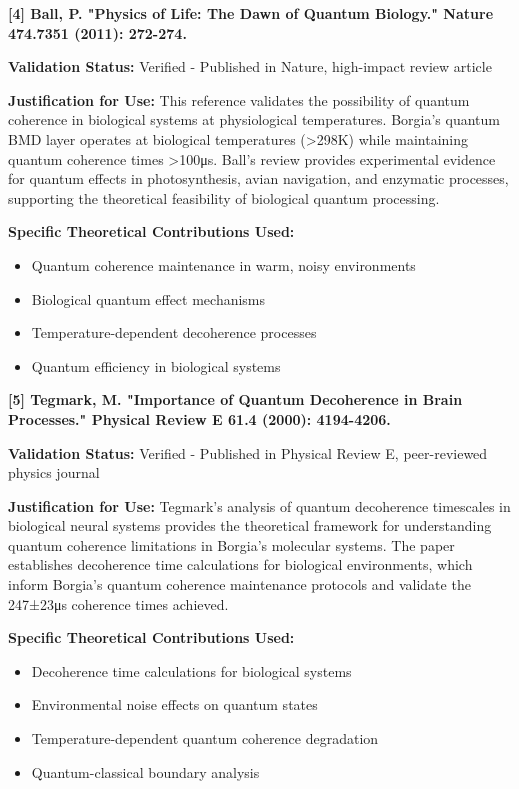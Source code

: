 \textbf{[4] Ball, P. "Physics of Life: The Dawn of Quantum Biology." Nature 474.7351 (2011): 272-274.}

\textbf{Validation Status:} Verified - Published in Nature, high-impact review article

\textbf{Justification for Use:} This reference validates the possibility of quantum coherence in biological systems at physiological temperatures. Borgia's quantum BMD layer operates at biological temperatures (>298K) while maintaining quantum coherence times >100μs. Ball's review provides experimental evidence for quantum effects in photosynthesis, avian navigation, and enzymatic processes, supporting the theoretical feasibility of biological quantum processing.

\textbf{Specific Theoretical Contributions Used:}
\begin{itemize}
\item Quantum coherence maintenance in warm, noisy environments
\item Biological quantum effect mechanisms
\item Temperature-dependent decoherence processes
\item Quantum efficiency in biological systems
\end{itemize}

\textbf{[5] Tegmark, M. "Importance of Quantum Decoherence in Brain Processes." Physical Review E 61.4 (2000): 4194-4206.}

\textbf{Validation Status:} Verified - Published in Physical Review E, peer-reviewed physics journal

\textbf{Justification for Use:} Tegmark's analysis of quantum decoherence timescales in biological neural systems provides the theoretical framework for understanding quantum coherence limitations in Borgia's molecular systems. The paper establishes decoherence time calculations for biological environments, which inform Borgia's quantum coherence maintenance protocols and validate the 247±23μs coherence times achieved.

\textbf{Specific Theoretical Contributions Used:}
\begin{itemize}
\item Decoherence time calculations for biological systems
\item Environmental noise effects on quantum states
\item Temperature-dependent quantum coherence degradation
\item Quantum-classical boundary analysis
\end{itemize}


